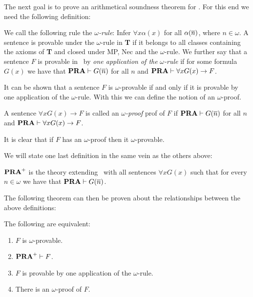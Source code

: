 \documentclass[../main.tex]{subfiles}
\begin{document}
The next goal is to prove an arithmetical soundness theorem for \GLB. For this
end we need the following definition:

\begin{defi}
	We call the following rule the  $\omega$\textit{-rule}: Infer $\forall
	x\alpha(x)$ for all $\alpha(\overline n)$, where $n\in\omega$. A sentence is
	provable under the $\omega$-rule in \textbf{T} if it belongs to all
	classes containing the axioms of \textbf{T} and closed under MP, Nec and
	the $\omega$-rule.
	We further say that a sentence $F$ is provable in \PRA\ by \textit{one
	application of the} $\omega$\textit{-rule} if for some formula $G(x)$
	we have that $\text{\textbf{PRA}}\vdash G(\overline n)$ for all $n$ and $\text{\textbf{PRA}}\vdash \forall
	x G(x)\rightarrow F$.
\end{defi}
It can be shown that  a sentence $F$ is $\omega$-provable if and only if it is provable
by one application of the $\omega$-rule. With this we can define the notion of
an $\omega$-proof.

\begin{defi}
	A sentence $\forall x G(x)\rightarrow F$ is called an
	$\omega$\textit{-proof} prof of $F$ if $\text{\textbf{PRA}}\vdash G(\overline n)$ for all
	$n$ and $\text{\textbf{PRA}}\vdash\forall x G(x)\rightarrow F$.
\end{defi}
It is clear that if $F$ has an $\omega$-proof then it $\omega$-provable.

We will state one last definition in the same vein as the others above:

\begin{defi}
	$\text{\textbf{PRA}}^+$ is the theory extending \PRA\ with all sentences $\forall x
	G(x)$ such that for every $n\in \omega$ we have that $\text{\textbf{PRA}}\vdash G(\overline
	n)$.
\end{defi}

The following theorem can then be proven about the relationships between the
above definitions:

\begin{thm}
	\label{thm:omega}
	The following are equivalent:
	\begin{enumerate}
		\item $F$ is $\omega$-provable.
		\item $\text{\textbf{PRA}}^+\vdash F$.
		\item $F$ is provable by one application of the $\omega$-rule.
		\item There is an $\omega$-proof of $F$.
	\end{enumerate}
\end{thm}
\end{document}
